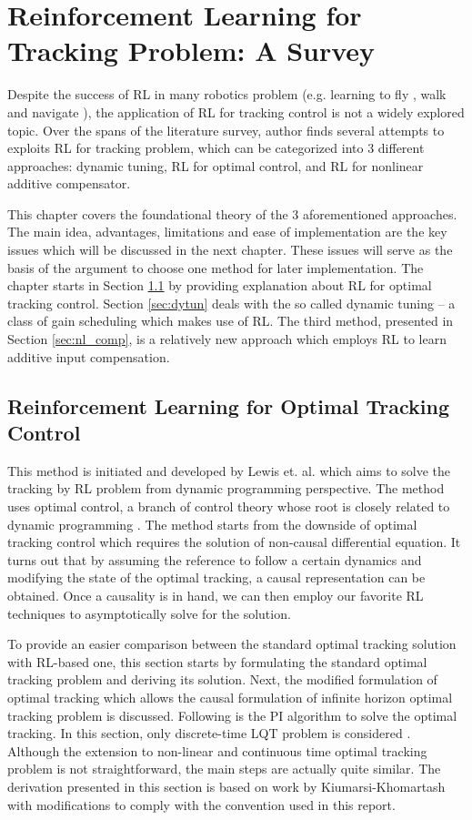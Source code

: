%
\chapter{Reinforcement Learning for Tracking Problem: A Survey} \label{chap::survey}
Despite the success of \ac{RL} in many robotics problem (e.g. learning to fly \cite{Abbeel}, walk \cite{NIPS2007_3253} and navigate \cite{4543641}), the application of \ac{RL} for tracking control is not a widely explored topic. Over the spans of the literature survey, author finds several attempts to exploits \ac{RL} for tracking problem, which can be categorized into 3 different approaches: dynamic tuning, \ac{RL} for optimal control, and \ac{RL} for nonlinear additive compensator. 

This chapter covers the foundational theory of the 3 aforementioned approaches. The main idea, advantages, limitations and ease of implementation are the key issues which will be discussed in the next chapter. These issues will serve as the basis of the argument to choose one method for later implementation. The chapter starts in Section \ref{sec:rl_lqt} by providing explanation about \ac{RL} for optimal tracking control. Section \ref{sec:dytun} deals with the so called dynamic tuning -- a class of gain scheduling which makes use of \ac{RL}. The third method, presented in Section \ref{sec:nl_comp}, is a relatively new approach which employs \ac{RL} to learn additive input compensation.


\section{Reinforcement Learning for Optimal Tracking Control} \label{sec:rl_lqt}
This method is initiated and developed by Lewis et. al. which aims to solve the tracking by \ac{RL} problem from dynamic programming perspective. The method uses optimal control, a branch of control theory whose root is closely related to dynamic programming \cite{126844}. The method starts from the downside of optimal tracking control which requires the solution of non-causal differential equation. It turns out that by assuming the reference to follow a certain dynamics and modifying the state of the optimal tracking, a causal representation can be obtained. Once a causality is in hand, we can then employ our favorite \ac{RL} techniques to asymptotically solve for the solution. 

To provide an easier comparison between the standard optimal tracking solution with \ac{RL}-based one, this section starts by formulating the standard optimal tracking problem and deriving its solution. Next, the modified formulation of optimal tracking which allows the causal formulation of infinite horizon optimal tracking problem is discussed. Following is the \ac{PI} algorithm to solve the optimal tracking. In this section, only discrete-time \ac{LQT} problem is considered \cite{Kiumarsi6760476}. Although the extension to non-linear and continuous time optimal tracking problem is not straightforward, the main steps are actually quite similar. The derivation presented in this section is based on work by Kiumarsi-Khomartash \cite{Kiumarsi6760476} with modifications to comply with the convention used in this report.

